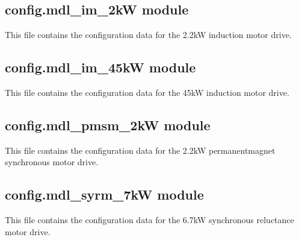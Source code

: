 \documentclass[letterpaper,10pt,english]{sphinxmanual}
\begin{document}
\subsection{config.mdl\_im\_2kW module}
\label{\detokenize{config:module-config.mdl_im_2kW}}\label{\detokenize{config:config-mdl-im-2kw-module}}
\sphinxAtStartPar
This file contains the configuration data for the 2.2\sphinxhyphen{}kW induction motor drive.


\subsection{config.mdl\_im\_45kW module}
\label{\detokenize{config:module-config.mdl_im_45kW}}\label{\detokenize{config:config-mdl-im-45kw-module}}
\sphinxAtStartPar
This file contains the configuration data for the 45\sphinxhyphen{}kW induction motor drive.


\subsection{config.mdl\_pmsm\_2kW module}
\label{\detokenize{config:module-config.mdl_pmsm_2kW}}\label{\detokenize{config:config-mdl-pmsm-2kw-module}}
\sphinxAtStartPar
This file contains the configuration data for the 2.2\sphinxhyphen{}kW permanent\sphinxhyphen{}magnet
synchronous motor drive.


\subsection{config.mdl\_syrm\_7kW module}
\label{\detokenize{config:module-config.mdl_syrm_7kW}}\label{\detokenize{config:config-mdl-syrm-7kw-module}}
\sphinxAtStartPar
This file contains the configuration data for the 6.7\sphinxhyphen{}kW synchronous reluctance
motor drive.
\end{document}
